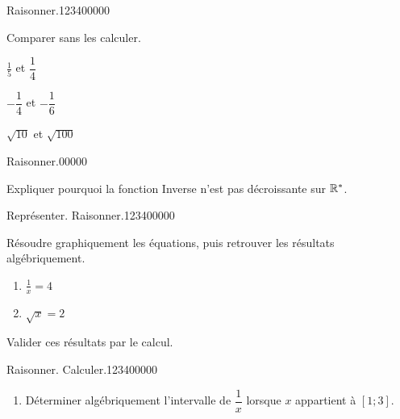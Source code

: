 \begin{pageAD} 




\begin{ExoCad}{Raisonner.}{1234}{0}{0}{0}{0}{0}

Comparer sans les calculer.
\begin{description}[leftmargin=*]
\item $\frac{1}{5}$ et $\dfrac{1}{4}$  

\item $-\dfrac{1}{4}$ et $-\dfrac{1}{6}$ 

\item $\sqrt{10}$ et $\sqrt{100}$ 

\end{description}

\end{ExoCad} 


\begin{ExoCadN}{Raisonner.}{0}{0}{0}{0}{0}

Expliquer pourquoi la fonction Inverse n'est pas décroissante sur $\mathbb R^*$.

\end{ExoCadN}
 

 

 

\begin{ExoCad}{Représenter. Raisonner.}{1234}{0}{0}{0}{0}{0}

Résoudre graphiquement les équations, puis retrouver les résultats algébriquement.
\begin{enumerate}[leftmargin=*]
\item $\frac{1}{x}=4$ 
\item $\sqrt{x}=2$ 
\end{enumerate}
Valider ces résultats par le calcul. 

\vspace{0.4cm}

\begin{minipage}{0.48\linewidth}
\end{minipage}
\hfill
\begin{minipage}{0.48\linewidth}
\end{minipage}

\end{ExoCad}


\begin{ExoCad}{Raisonner. Calculer.}{1234}{0}{0}{0}{0}{0}
\begin{enumerate}[leftmargin=*]
\item Déterminer algébriquement l'intervalle de $\dfrac{1}{x}$ lorsque $x$ appartient à $[1;3]$. 


\end{enumerate}
\end{ExoCad}
\end{pageAD}
